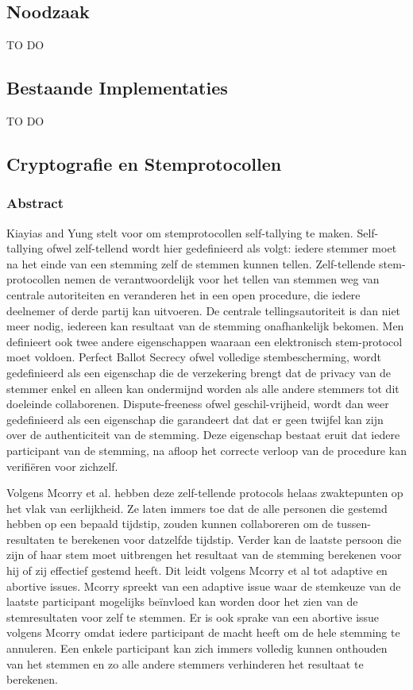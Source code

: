 	\subsection{Noodzaak}
			TO DO
	\subsection{Bestaande Implementaties}
			TO DO
	\subsection{Cryptografie en Stemprotocollen}
		\subsubsection{Abstract}
		Kiayias and Yung stelt voor om stemprotocollen self-tallying te maken. Self-tallying ofwel zelf-tellend wordt hier gedefinieerd als volgt: iedere stemmer moet na het einde van een stemming zelf de stemmen kunnen tellen. Zelf-tellende stem-protocollen nemen de verantwoordelijk voor het tellen van stemmen weg van centrale autoriteiten en veranderen het in een open procedure, die iedere deelnemer of derde partij kan uitvoeren. De centrale tellingsautoriteit is dan niet meer nodig, iedereen kan resultaat van de stemming onafhankelijk bekomen. Men definieert ook twee andere eigenschappen waaraan een elektronisch stem-protocol moet voldoen.  Perfect Ballot Secrecy ofwel volledige stembescherming, wordt gedefinieerd als een eigenschap die de verzekering brengt dat de privacy van de stemmer enkel en alleen kan ondermijnd worden als alle andere stemmers tot dit doeleinde collaborenen. Dispute-freeness ofwel geschil-vrijheid, wordt dan weer gedefinieerd als een eigenschap die garandeert dat dat er geen twijfel kan zijn over de authenticiteit van de stemming. Deze eigenschap bestaat eruit dat iedere participant van de stemming, na afloop het correcte verloop van de procedure kan verifiëren voor zichzelf.
			
		Volgens Mcorry et al.  hebben deze zelf-tellende protocols helaas zwaktepunten op het vlak van eerlijkheid. Ze laten immers toe dat de alle personen die gestemd hebben op een bepaald tijdstip, zouden kunnen collaboreren om de tussen-resultaten te berekenen voor datzelfde tijdstip. Verder kan de laatste persoon die zijn of haar stem moet uitbrengen het resultaat van de stemming berekenen voor hij of zij effectief gestemd heeft. Dit leidt volgens Mcorry et al tot adaptive en abortive issues.  Mcorry spreekt van een adaptive issue waar de stemkeuze van de laatste participant mogelijks beïnvloed kan worden door het zien van de stemresultaten voor zelf te stemmen. Er is ook sprake van een abortive issue volgens Mcorry omdat iedere participant de macht heeft om de hele stemming te annuleren. Een enkele participant kan zich immers volledig kunnen onthouden van het stemmen en zo alle andere stemmers verhinderen het resultaat te berekenen. 
			
